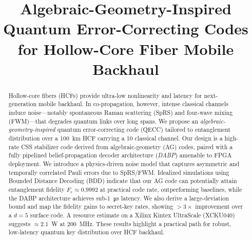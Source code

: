 



\title{Algebraic-Geometry-Inspired Quantum Error-Correcting Codes for Hollow-Core Fiber Mobile Backhaul}

\author{}

\maketitle

\begin{abstract}
Hollow-core fibers (HCFs) provide ultra-low nonlinearity and latency for next-generation mobile backhaul. In co-propagation, however, intense classical channels induce noise---notably spontaneous Raman scattering (SpRS) and four-wave mixing (FWM)---that degrades quantum links over long spans. We propose an \emph{algebraic-geometry-inspired} quantum error-correcting code (QECC) tailored to entanglement distribution over a \SI{100}{\kilo\meter} HCF carrying a \SI{10}{\dBm} classical channel. Our design is a high-rate CSS stabilizer code derived from algebraic-geometry (AG) codes, paired with a fully pipelined belief-propagation decoder architecture (\emph{DABP}) amenable to FPGA deployment. We introduce a physics-driven noise model that captures asymmetric and temporally correlated Pauli errors due to SpRS/FWM. Idealized simulations using Bounded Distance Decoding (BDD) indicate that our AG code can potentially attain entanglement fidelity \(F_e \approx 0.9992\) at practical code rate, outperforming baselines, while the DABP architecture achieves sub-\SI{1}{\micro\second} latency. We also derive a large-deviation bound and map the fidelity gains to secret-key rates, showing \(>\!3\times\) improvement over a \(d=5\) surface code. A resource estimate on a Xilinx Kintex UltraScale (XCKU040) suggests \(\approx\)\SI{2.1}{\watt} at \SI{200}{\mega\hertz}. These results highlight a practical path for robust, low-latency quantum key distribution over HCF backhaul.
\end{abstract}

